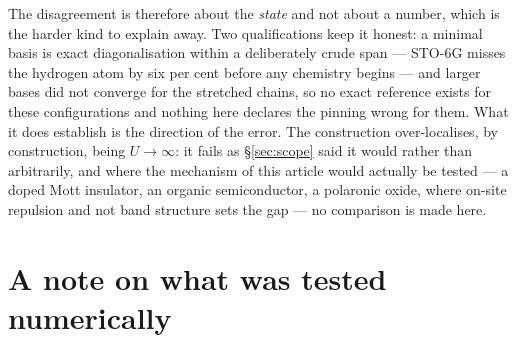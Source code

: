 \documentclass[11pt]{article}
\begin{document}
The disagreement is therefore about the \emph{state} and not about a number, which is the harder
kind to explain away. Two qualifications keep it honest: a minimal basis is exact diagonalisation
within a deliberately crude span --- STO-6G misses the hydrogen atom by six per cent before any
chemistry begins --- and larger bases did not converge for the stretched chains, so no exact
reference exists for these configurations and nothing here declares the pinning wrong for them. What
it does establish is the direction of the error. The construction over-localises, by construction,
being $U\to\infty$: it fails as \S\ref{sec:scope} said it would rather than arbitrarily, and where
the mechanism of this article would actually be tested --- a doped Mott insulator, an organic
semiconductor, a polaronic oxide, where on-site repulsion and not band structure sets the gap --- no
comparison is made here.


\section*{A note on what was tested numerically}
\end{document}
